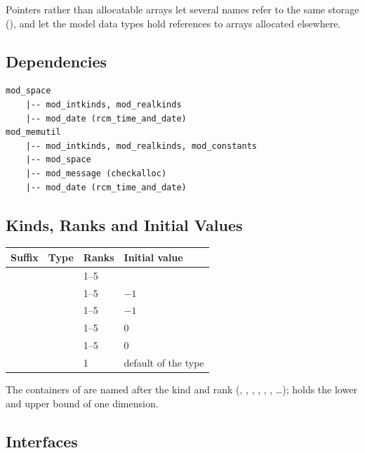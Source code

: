 \noindent Pointers rather than allocatable arrays let several names refer to
the same storage (), and let the model data types hold
references to arrays allocated elsewhere.

\subsection{Dependencies}

\begin{lstlisting}
mod_space
    |-- mod_intkinds, mod_realkinds
    |-- mod_date (rcm_time_and_date)
mod_memutil
    |-- mod_intkinds, mod_realkinds, mod_constants
    |-- mod_space
    |-- mod_message (checkalloc)
    |-- mod_date (rcm_time_and_date)
\end{lstlisting}

\subsection{Kinds, Ranks and Initial Values}

\begin{longtable}{L{1.4cm} L{4.2cm} L{2.6cm} L{5.4cm}}
  \toprule
  \textbf{Suffix} & \textbf{Type} & \textbf{Ranks} &
  \textbf{Initial value} \\
  \midrule
  \endhead
  \bottomrule
  \endfoot
   &  & 1--5 &  \\
   &  & 1--5 & $-1$ \\
   &  & 1--5 & $-1$ \\
   &  & 1--5 & 0 \\
   &  & 1--5 & 0 \\
   &  & 1 & default of the type \\
\end{longtable}

\noindent The containers of  are named after the kind and
rank (, , , ,
, , \ldots);  holds the lower and
upper bound of one dimension.

\subsection{Interfaces}

